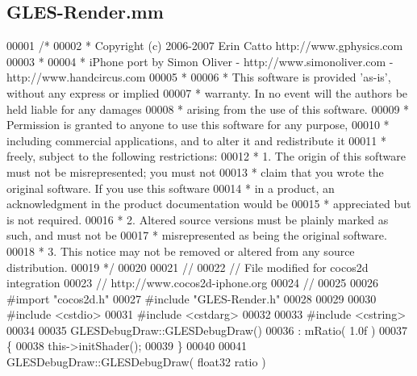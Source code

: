 \hypertarget{_g_l_e_s-_render_8mm}{\subsection{G\-L\-E\-S-\/\-Render.mm}
\label{d3/db9/_g_l_e_s-_render_8mm}
}

\begin{DoxyCode}
00001 \textcolor{comment}{/*}
00002 \textcolor{comment}{ * Copyright (c) 2006-2007 Erin Catto http://www.gphysics.com}
00003 \textcolor{comment}{ *}
00004 \textcolor{comment}{ * iPhone port by Simon Oliver - http://www.simonoliver.com - http://www.handcircus.com}
00005 \textcolor{comment}{ *}
00006 \textcolor{comment}{ * This software is provided 'as-is', without any express or implied}
00007 \textcolor{comment}{ * warranty.  In no event will the authors be held liable for any damages}
00008 \textcolor{comment}{ * arising from the use of this software.}
00009 \textcolor{comment}{ * Permission is granted to anyone to use this software for any purpose,}
00010 \textcolor{comment}{ * including commercial applications, and to alter it and redistribute it}
00011 \textcolor{comment}{ * freely, subject to the following restrictions:}
00012 \textcolor{comment}{ * 1. The origin of this software must not be misrepresented; you must not}
00013 \textcolor{comment}{ * claim that you wrote the original software. If you use this software}
00014 \textcolor{comment}{ * in a product, an acknowledgment in the product documentation would be}
00015 \textcolor{comment}{ * appreciated but is not required.}
00016 \textcolor{comment}{ * 2. Altered source versions must be plainly marked as such, and must not be}
00017 \textcolor{comment}{ * misrepresented as being the original software.}
00018 \textcolor{comment}{ * 3. This notice may not be removed or altered from any source distribution.}
00019 \textcolor{comment}{ */}
00020 
00021 \textcolor{comment}{//}
00022 \textcolor{comment}{// File modified for cocos2d integration}
00023 \textcolor{comment}{// http://www.cocos2d-iphone.org}
00024 \textcolor{comment}{//}
00025 
00026 \textcolor{preprocessor}{#import "cocos2d.h"}
00027 \textcolor{preprocessor}{#include "GLES-Render.h"}
00028 
00029 
00030 \textcolor{preprocessor}{#include <cstdio>}
00031 \textcolor{preprocessor}{#include <cstdarg>}
00032 
00033 \textcolor{preprocessor}{#include <cstring>}
00034 
00035 GLESDebugDraw::GLESDebugDraw()
00036 : mRatio( 1.0f )
00037 \{
00038     this->initShader();
00039 \}
00040 
00041 GLESDebugDraw::GLESDebugDraw( float32 ratio )

\end{DoxyCode}
